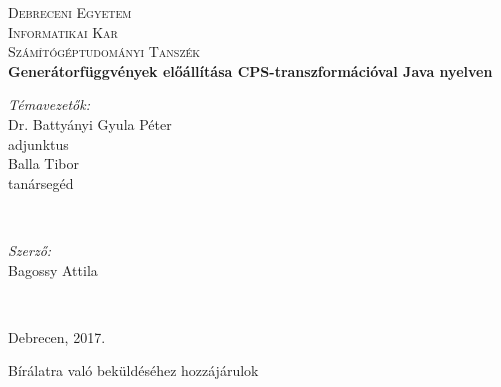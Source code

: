 %
%
%

\begin{titlepage}

\center

\textsc{\LARGE Debreceni Egyetem}\\[1.5cm]
\textsc{\Large Informatikai Kar}
\\[0.5cm]

\textsc{\large Számítógéptudományi Tanszék}
\\[2.5cm]

{\huge \bfseries Generátorfüggvények előállítása CPS-transzformációval Java nyelven}

\if{}
  \vspace*{7.5cm}

  \begin{minipage}[t]{0.4\textwidth}
    \begin{flushleft} 
      \large \textit{Témavezetők:} \\
      Dr. Battyányi Gyula Péter  \\
      adjunktus \\
      Balla Tibor \\
      tanársegéd 
      \par
    \end{flushleft}
  \end{minipage}
  ~
  \begin{minipage}[t]{0.4\textwidth}
    \begin{flushright}
      \large \textit{Szerző:}\\
      Bagossy Attila 
      \par
    \end{flushright}
  \end{minipage}
  \\[2.5cm]
\else
  \vspace*{11.5cm}
\fi

{\large Debrecen, 2017.}\\ 

\begin{flushleft}
	Bírálatra való beküldéséhez hozzájárulok
\end{flushleft}

\vfill

\end{titlepage}